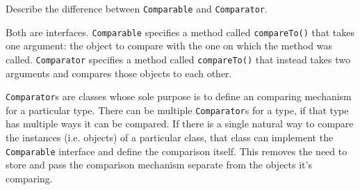 Describe the difference between \texttt{Comparable} and \texttt{Comparator}. \\
\begin{answer}
Both are interfaces.
\texttt{Comparable} specifies a method called \texttt{compareTo()} that takes one argument: the object to compare with the one on which the method was called.
\texttt{Comparator} specifies a method called \texttt{compareTo()} that instead takes two arguments and compares those objects to each other.

\texttt{Comparator}s are classes whose sole purpose is to define an comparing mechanism for a particular type. There can be multiple \texttt{Comparator}s for a type, if that type has multiple ways it can be compared. If there is a single natural way to compare the instances (i.e. objects) of a particular class, that class can implement the \texttt{Comparable} interface and define the comparison itself. This removes the need to store and pass the comparison mechanism separate from the objects it's comparing.
\end{answer}

